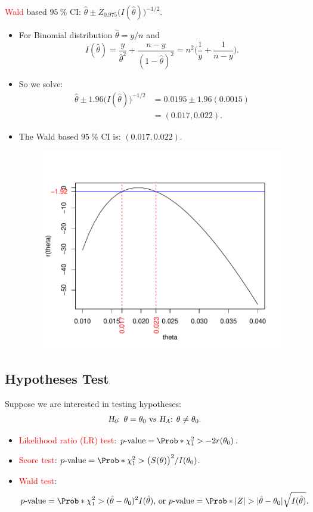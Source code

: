 \documentclass{article}\usepackage[]{graphicx}\usepackage[svgnames]{xcolor}
\newcommand{\HN}{\textsl{H}_{\textsl{0}}}%
\newcommand{\HA}{\textsl{H}_{\textsl{A}}}%
\DeclarePairedDelimiter\abs{\lvert}{\rvert}
\begin{document}
\textcolor{Red}{Wald} based $ \qty{95}{\percent} $ CI: $ \hat{\theta}\pm Z_{0.975}\bigl(I(\hat{\theta})\bigr)^{-1/2} $.
\begin{itemize}
      \item For Binomial distribution $ \hat{\theta}=y/n $ and
            \[ I(\hat{\theta})=\frac{y}{\hat{\theta}^2}+\frac{n-y}{(1-\hat{\theta})^2}=n^2\biggl(\frac{1}{y} +\frac{1}{n-y}\biggr).   \]
      \item So we solve:
            \begin{align*}
                  \hat{\theta}\pm 1.96\bigl(I(\hat{\theta})\bigr)^{-1/2}
                   & =0.0195 \pm 1.96(0.0015) \\
                   & =(0.017, 0.022).
            \end{align*}
      \item The Wald based $ \qty{95}{\percent} $ CI is: $ (0.017, 0.022) $.
            \begin{figure}[!htbp]
                  \centering
                  \includegraphics{figures/1bLR.pdf}
            \end{figure}
\end{itemize}
\subsection*{Hypotheses Test}
Suppose we are interested in testing hypotheses:
\[ \text{$\HN$: $\theta=\theta_0$ vs $\HA$: $\theta\ne \theta_0$.} \]
\begin{itemize}
      \item \textcolor{Red}{Likelihood ratio (LR) test}: $ p\text{-value}=\Prob*{\chi^2_1>-2r(\theta_0)} $.
      \item \textcolor{Red}{Score test}: $ p\text{-value}=\Prob*{\chi^2_1>\bigl(S(\theta)\bigr)^2/I(\theta_0)} $.
      \item \textcolor{Red}{Wald test}:
            \[ p\text{-value}=\Prob*{\chi^2_1>(\hat{\theta}-\theta_0)^2 I(\hat{\theta})}\text{, or }
                  p\text{-value}=\Prob*{\abs{Z}>\abs{\hat{\theta}-\theta_0}\sqrt{I(\hat{\theta})}}. \]
\end{itemize}
\end{document}
